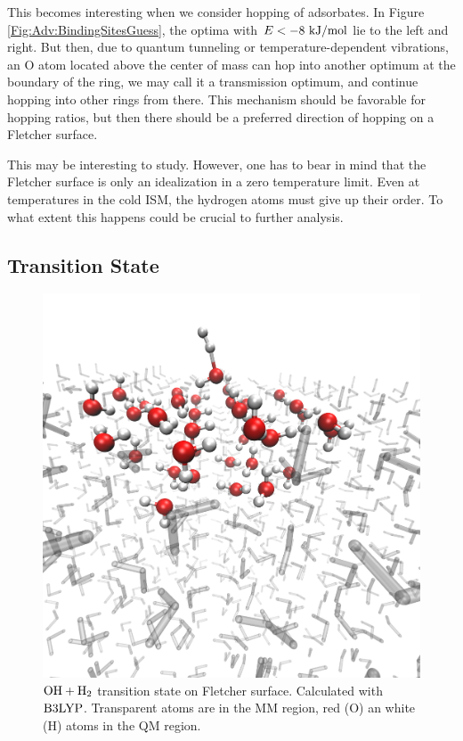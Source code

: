 
This becomes interesting when we consider hopping of adsorbates. In
Figure \ref{Fig:Adv:BindingSitesGuess}, the optima with $E<-8~\text {kJ/mol}$ lie to the
left and right. But then, due to quantum tunneling or temperature-dependent
vibrations, an O atom located above the center of mass can hop into another
optimum at the boundary of the ring, we may call it a transmission optimum, and
continue hopping into other rings from there. This mechanism should be
favorable for hopping ratios, but then there should be a preferred direction
of hopping on a Fletcher surface.

This may be interesting to study. However, one has to bear in mind that the
Fletcher surface is only an idealization in a zero temperature limit. Even at
temperatures in the cold ISM, the hydrogen atoms must give up their order. To
what extent this happens could be crucial to further analysis.


\subsection{Transition State}
\label{Sec:Adv:Trans}
\newcommand\hoht{\mbox{\enmat{\ho+\htw}}}

\begin{figure}[t!]
\centering
\includegraphics[width=.8\textwidth]{./img/FletcherAdsorption.png}
\caption{$\hoht$ transition state on Fletcher surface. Calculated with $\text{B3LYP}$.
Transparent atoms are in the MM region, red (O) an white (H) atoms in the QM
region.}
\label{Fig:Adv:TS}
\end{figure}


